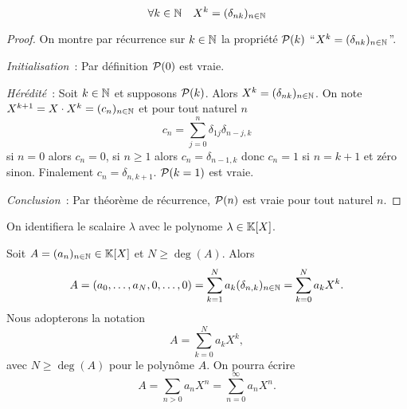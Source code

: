 \begin{lemme}
  \begin{equation}
    \forall k\in \N \quad X^k = (\delta_{nk})_{n \in \N}
  \end{equation}
\end{lemme}
\begin{proof}
  On montre par récurrence sur \(k \in \N\) la propriété \(\P(k)\) ``\(X^k =
  (\delta_{nk})_{n \in \N}\)''.

  \emph{Initialisation}~: Par définition \(\P(0)\) est vraie.

  \emph{Hérédité}~: Soit \(k \in \N\) et supposons \(\P(k)\). Alors
  \(X^k = (\delta_{nk})_{n \in \N}\). On note \(X^{k+1} = X \cdot X^k = (c_n)_{n \in
  \N}\) et pour tout naturel \(n\)
  \begin{equation}
    c_n = \sum_{j = 0}^n \delta_{1j} \delta_{n-j,k}
  \end{equation}
  si \(n = 0\) alors \(c_n = 0\), si \(n \geqslant 1\) alors \(c_n = \delta_{n-1,k}\)
  donc \(c_n = 1\) si \(n = k+1\) et zéro sinon. Finalement \(c_n = \delta_{n,k+1}\).
  \(\P(k = 1)\) est vraie.

  \emph{Conclusion}~: Par théorème de récurrence, \(\P(n)\) est vraie pour tout
  naturel \(n\).
\end{proof}

On identifiera le scalaire \(\lambda\) avec le polynome \(\lambda \in \K[X]\).

Soit \(A = (a_n)_{n \in \N} \in \K[X]\) et \(N \geqslant \deg(A)\). Alors
\begin{equation}
  A = (a_0, \ldots, a_N, 0, \ldots, 0) = \sum_{k = 1}^N a_k (\delta_{n,k})_{n \in
  \N} = \sum_{k = 0}^N a_k X^k.
\end{equation}
Nous adopterons la notation
\begin{equation}
  A = \sum_{k = 0}^N a_k X^k,
\end{equation}
avec \(N \geqslant \deg(A)\) pour le polynôme \(A\). On pourra écrire
\begin{equation}
  A = \sum_{n>0} a_n X^n = \sum_{n = 0}^{\infty} a_n X^n.
\end{equation}

